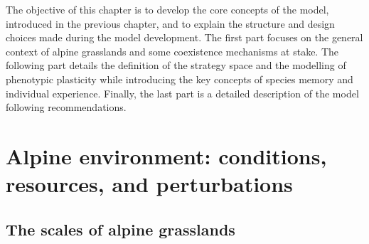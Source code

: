 %


\begin{fullwidth}
The objective of this chapter is to develop the core concepts of the model, introduced in the previous chapter, and to explain the structure and design choices made during the model development. The first part focuses on the general context of alpine grasslands and some coexistence mechanisms at stake. The following part details the definition of the strategy space and the modelling of phenotypic plasticity while introducing the key concepts of species memory and individual experience. Finally, the last part is a detailed description of the model following \parencite{grimm_standard_2006} recommendations.
\end{fullwidth}

\chapter{Alpine environment: conditions, resources, and perturbations}
\section{The scales of alpine grasslands}

